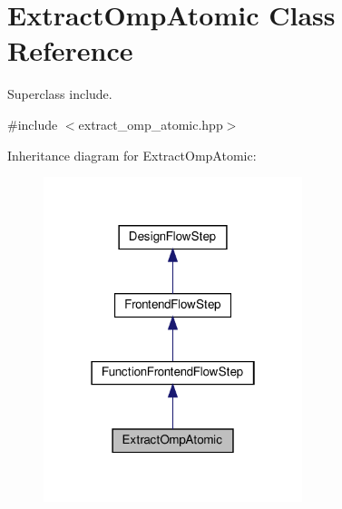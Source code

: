 \hypertarget{classExtractOmpAtomic}{}\section{Extract\+Omp\+Atomic Class Reference}
\label{classExtractOmpAtomic}


Superclass include.  




{\ttfamily \#include $<$extract\+\_\+omp\+\_\+atomic.\+hpp$>$}



Inheritance diagram for Extract\+Omp\+Atomic\+:
\nopagebreak
\begin{figure}[H]
\begin{center}
\leavevmode
\includegraphics[width=214pt]{d0/d98/classExtractOmpAtomic__inherit__graph}
\end{center}
\end{figure}


